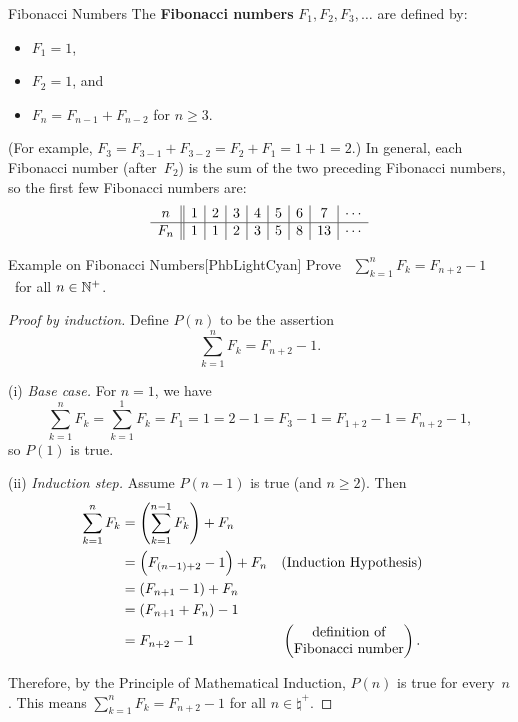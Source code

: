 \documentclass[../MATH-2000-Notes.tex]{subfiles}
\begin{document}
\begin{Definition}
    {Fibonacci Numbers}
    The \textbf{Fibonacci numbers} $F_1,F_2,F_3,\ldots$ are defined by:
    \begin{itemize}
        \item $F_1 = 1$,
        \item $F_2 = 1$,
              and
        \item $F_n = F_{n-1} + F_{n-2}$ for $n \ge 3$.
    \end{itemize}
    (For example, $F_3 = F_{3-1} + F_{3-2} = F_2 + F_1 = 1 + 1 = 2$.)
    In general, each Fibonacci number (after~$F_2$) is the sum of the two preceding Fibonacci numbers, so
    the first few Fibonacci numbers are:
    $$\begin{array}{c||c|c|c|c|c|c|c|c}
            n   & 1 & 2 & 3 & 4 & 5 & 6 & 7  & \cdots \\
            \noalign{\hrule}
            F_n & 1 & 1 & 2 & 3 & 5 & 8 & 13 & \cdots
        \end{array}$$
\end{Definition}

\begin{commentbox}{Example on Fibonacci Numbers}[{PhbLightCyan}]
    Prove \ $\displaystyle \sum\limits_{k=1}^n F_k = F_{n+2} - 1$ \ for all $n \in \mathbb{N}^+$.
\end{commentbox}
\begin{proof}[Proof by induction]
    Define $P(n)$ to be the assertion
    $$ \sum_{k=1}^n F_k = F_{n+2} - 1 .$$

    \medskip

    (i) \emph{Base case.} For $n = 1$, we have
    $$ \sum_{k=1}^n F_k = \sum_{k=1}^1 F_k = F_1 = 1 = 2 - 1 = F_3 - 1 = F_{1+2} - 1 = F_{n+2} - 1,$$
    so $P(1)$ is true.

    \medskip
    (ii) \emph{Induction step.} Assume $P(n-1)$ is true (and $n \ge 2$). Then
    \begin{align*}
        \sum_{k=1}^n F_k
         & = \left( \sum_{k=1}^{n-1} F_k \right) + F_n
        \\&= \Bigl( F_{(n-1)+2} - 1 \Bigr) + F_n && \text{(Induction Hypothesis)}
        \\&= (F_{n+1} - 1) + F_n
        \\&= (F_{n+1} + F_n) - 1
        \\&= F_{n+2} - 1
         &                                             & \begin{pmatrix} \text{definition of} \\ \text{Fibonacci number} \end{pmatrix}
        .\end{align*}

    \medskip
    Therefore, by the Principle of Mathematical Induction, $P(n)$ is true for every~$n$. This means
    $\displaystyle \sum\limits_{k=1}^n F_k = F_{n+2} - 1$ for all $n \in \natural^+$.
\end{proof}
\end{document}
